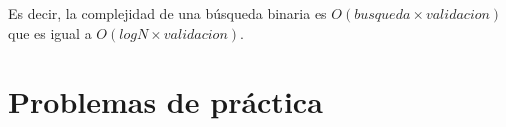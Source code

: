 Es decir, la complejidad de una búsqueda binaria es \(O(busqueda \times validacion)\) que es igual a \(O(logN \times validacion)\).


\section*{Problemas de práctica}

\begin{exercise}
\end{exercise}

\begin{exercise}
\end{exercise}